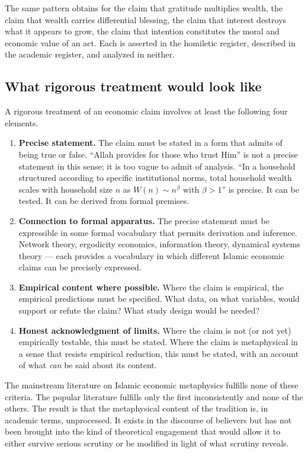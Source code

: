 The same pattern obtains for the claim that gratitude multiplies
wealth, the claim that wealth carries differential blessing, the
claim that interest destroys what it appears to grow, the claim that
intention constitutes the moral and economic value of an act. Each
is asserted in the homiletic register, described in the academic
register, and analyzed in neither.

\subsection{What rigorous treatment would look like}

A rigorous treatment of an economic claim involves at least the
following four elements.

\begin{enumerate}[leftmargin=2em]
    \item \textbf{Precise statement.} The claim must be stated in a
    form that admits of being true or false. ``Allah provides for
    those who trust Him'' is not a precise statement in this sense;
    it is too vague to admit of analysis. ``In a household structured
    according to specific institutional norms, total household
    wealth scales with household size $n$ as $W(n) \sim n^\beta$
    with $\beta > 1$'' is precise. It can be tested. It can be
    derived from formal premises.
    \item \textbf{Connection to formal apparatus.} The precise
    statement must be expressible in some formal vocabulary that
    permits derivation and inference. Network theory, ergodicity
    economics, information theory, dynamical systems theory --- each
    provides a vocabulary in which different Islamic economic claims
    can be precisely expressed.
    \item \textbf{Empirical content where possible.} Where the claim
    is empirical, the empirical predictions must be specified. What
    data, on what variables, would support or refute the claim?
    What study design would be needed?
    \item \textbf{Honest acknowledgment of limits.} Where the claim
    is not (or not yet) empirically testable, this must be stated.
    Where the claim is metaphysical in a sense that resists
    empirical reduction, this must be stated, with an account of
    what \emph{can} be said about its content.
\end{enumerate}

The mainstream literature on Islamic economic metaphysics fulfills
none of these criteria. The popular literature fulfills only the
first inconsistently and none of the others. The result is that the
metaphysical content of the tradition is, in academic terms,
unprocessed. It exists in the discourse of believers but has not
been brought into the kind of theoretical engagement that would
allow it to either survive serious scrutiny or be modified in light
of what scrutiny reveals.

